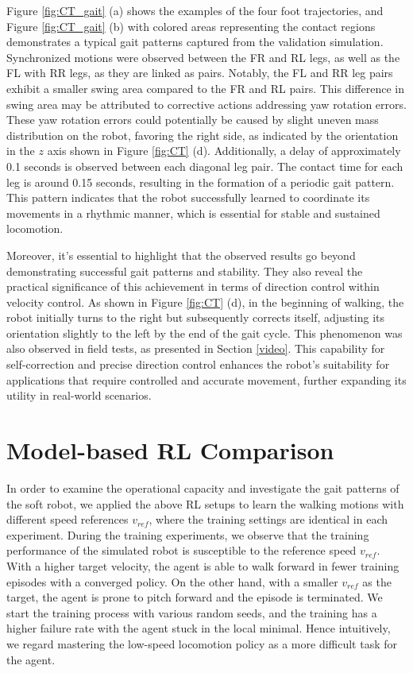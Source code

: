Figure \ref{fig:CT_gait} (a) shows the examples of the four foot trajectories, and Figure \ref{fig:CT_gait} (b) with colored areas representing the contact regions demonstrates a typical gait patterns captured from the validation simulation. Synchronized motions were observed between the FR and RL legs, as well as the FL with RR legs, as they are linked as pairs. Notably, the FL and RR leg pairs exhibit a smaller swing area compared to the FR and RL pairs. This difference in swing area may be attributed to corrective actions addressing yaw rotation errors. These yaw rotation errors could potentially be caused by slight uneven mass distribution on the robot, favoring the right side, as indicated by the orientation in the $z$ axis shown in Figure \ref{fig:CT} (d). Additionally, a delay of approximately 0.1 seconds is observed between each diagonal leg pair. The contact time for each leg is around 0.15 seconds, resulting in the formation of a periodic gait pattern. This pattern indicates that the robot successfully learned to coordinate its movements in a rhythmic manner, which is essential for stable and sustained locomotion.



Moreover, it's essential to highlight that the observed results go beyond demonstrating successful gait patterns and stability. They also reveal the practical significance of this achievement in terms of direction control within velocity control. As shown in Figure \ref{fig:CT} (d), in the beginning of walking, the robot initially turns to the right but subsequently corrects itself, adjusting its orientation slightly to the left by the end of the gait cycle. This phenomenon was also observed in field tests, as presented in Section \ref{video}. This capability for self-correction and precise direction control enhances the robot's suitability for applications that require controlled and accurate movement, further expanding its utility in real-world scenarios. 

\section{Model-based RL Comparison}
\label{Sec:MBRL}
In order to examine the operational capacity and investigate the gait patterns of the soft robot, we applied the above RL setups to learn the walking motions with different speed references $v_{ref}$, where the training settings are identical in each experiment. During the training experiments, we observe that the training performance of the simulated robot is susceptible to the reference speed $v_{ref}$. With a higher target velocity, the agent is able to walk forward in fewer training episodes with a converged policy. On the other hand, with a smaller $v_{ref}$ as the target, the agent is prone to pitch forward and the episode is terminated. We start the training process with various random seeds, and the training has a higher failure rate with the agent stuck in the local minimal. Hence intuitively, we regard mastering the low-speed locomotion policy as a more difficult task for the agent.

